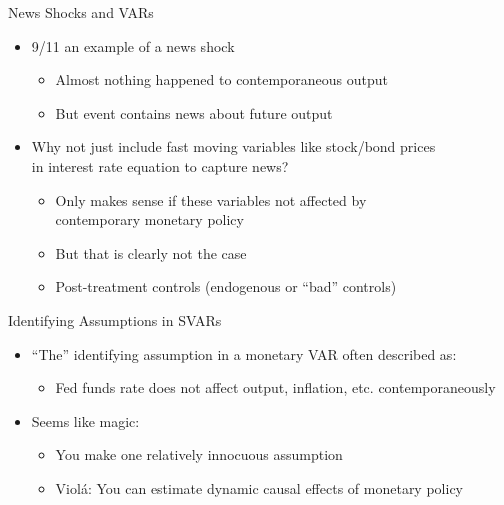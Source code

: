 \documentclass[11pt,aspectratio=169,xcolor={dvipsnames},hyperref={pdftex,pdfpagemode=UseNone,hidelinks,pdfdisplaydoctitle=true},usepdftitle=false]{beamer}
\begin{document}
\begin{frame}{News Shocks and VARs}
\begin{itemize}
	\item 9/11 an example of a news shock
	\begin{itemize}
		\item Almost nothing happened to contemporaneous output
		\item But event contains news about future output
	\end{itemize} \pause
	\item Why not just include fast moving variables like stock/bond prices \\ in interest rate equation to capture news? \pause
	\begin{itemize}
		\item Only makes sense if these variables not affected by \\ contemporary monetary policy
		\item But that is clearly not the case
		\item Post-treatment controls (endogenous or ``bad'' controls)
	\end{itemize}
\end{itemize}
\end{frame}


\begin{frame}{Identifying Assumptions in SVARs}
\begin{itemize}
\itemsep1em 
\item``The'' identifying assumption in a monetary VAR often described as:
\begin{itemize}
\item Fed funds rate does not affect output, inflation, etc. contemporaneously
\end{itemize}
\item Seems like magic:
\begin{itemize}
\item You make one relatively innocuous assumption
\item Viol\'{a}: You can estimate dynamic causal effects of monetary policy 
\end{itemize}
\end{itemize}
\end{frame}
\end{document}
